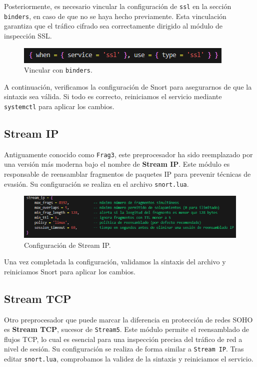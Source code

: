 \documentclass[12pt,a4paper]{report}
\begin{document}
Posteriormente, es necesario vincular la configuración de \texttt{ssl} en la sección \texttt{binders}, en caso de que no se haya hecho previamente. Esta vinculación garantiza que el tráfico cifrado sea correctamente dirigido al módulo de inspección SSL.

\begin{figure}[H]
	\centering
	\includegraphics[scale=0.8]{ssl_inspect/9.png}
	\caption{Vincular con \texttt{binders}.}
\end{figure}

A continuación, verificamos la configuración de Snort para asegurarnos de que la sintaxis sea válida. Si todo es correcto, reiniciamos el servicio mediante \texttt{systemctl} para aplicar los cambios.

\subsection{Stream IP}

Antiguamente conocido como \texttt{Frag3}, este preprocesador ha sido reemplazado por una versión más moderna bajo el nombre de \textbf{Stream IP}. Este módulo es responsable de reensamblar fragmentos de paquetes IP para prevenir técnicas de evasión. Su configuración se realiza en el archivo \texttt{snort.lua}.

\begin{figure}[H]
	\centering
	\includegraphics[scale=0.8]{stream_ip/1.png}
	\caption{Configuración de Stream IP.}
\end{figure}

Una vez completada la configuración, validamos la sintaxis del archivo y reiniciamos Snort para aplicar los cambios.

\newpage

\subsection{Stream TCP}

Otro preprocesador que puede marcar la diferencia en protección de redes SOHO es \textbf{Stream TCP}, sucesor de \texttt{Stream5}. Este módulo permite el reensamblado de flujos TCP, lo cual es esencial para una inspección precisa del tráfico de red a nivel de sesión. Su configuración se realiza de forma similar a \texttt{Stream IP}. Tras editar \texttt{snort.lua}, comprobamos la validez de la sintaxis y reiniciamos el servicio.
\end{document}
